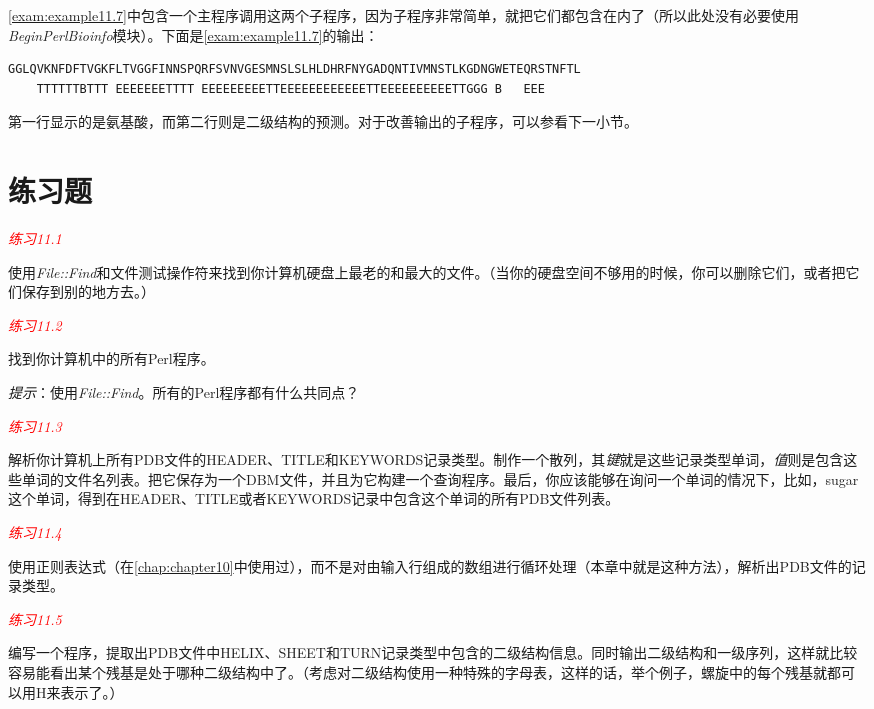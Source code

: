\autoref{exam:example11.7}中包含一个主程序调用这两个子程序，因为子程序非常简单，就把它们都包含在内了（所以此处没有必要使用\textit{BeginPerlBioinfo}模块）。下面是\autoref{exam:example11.7}的输出： 

\begin{lstlisting}
GGLQVKNFDFTVGKFLTVGGFINNSPQRFSVNVGESMNSLSLHLDHRFNYGADQNTIVMNSTLKGDNGWETEQRSTNFTL
    TTTTTTBTTT EEEEEEETTTT EEEEEEEEETTEEEEEEEEEEEETTEEEEEEEEEETTGGG B   EEE     
\end{lstlisting}

第一行显示的是氨基酸，而第二行则是二级结构的预测。对于改善输出的子程序，可以参看下一小节。

\section{练习题}
\textcolor{red}{\textit{练习11.1}}
\begin{adjustwidth}{1cm}{}
使用\textit{File::Find}和文件测试操作符来找到你计算机硬盘上最老的和最大的文件。（当你的硬盘空间不够用的时候，你可以删除它们，或者把它们保存到别的地方去。）
\end{adjustwidth}

\textcolor{red}{\textit{练习11.2}}
\begin{adjustwidth}{1cm}{}
找到你计算机中的所有Perl程序。

\textit{提示}：使用\textit{File::Find}。所有的Perl程序都有什么共同点？
\end{adjustwidth}

\textcolor{red}{\textit{练习11.3}}
\begin{adjustwidth}{1cm}{}
  解析你计算机上所有PDB文件的HEADER、TITLE和KEYWORDS记录类型。制作一个散列，其\textit{键}就是这些记录类型单词，\textit{值}则是包含这些单词的文件名列表。把它保存为一个DBM文件，并且为它构建一个查询程序。最后，你应该能够在询问一个单词的情况下，比如，sugar这个单词，得到在HEADER、TITLE或者KEYWORDS记录中包含这个单词的所有PDB文件列表。
\end{adjustwidth}

\textcolor{red}{\textit{练习11.4}}
\begin{adjustwidth}{1cm}{}
使用正则表达式（在\autoref{chap:chapter10}中使用过），而不是对由输入行组成的数组进行循环处理（本章中就是这种方法），解析出PDB文件的记录类型。
\end{adjustwidth}

\textcolor{red}{\textit{练习11.5}}
\begin{adjustwidth}{1cm}{}
编写一个程序，提取出PDB文件中HELIX、SHEET和TURN记录类型中包含的二级结构信息。同时输出二级结构和一级序列，这样就比较容易能看出某个残基是处于哪种二级结构中了。（考虑对二级结构使用一种特殊的字母表，这样的话，举个例子，螺旋中的每个残基就都可以用H来表示了。）
\end{adjustwidth}

